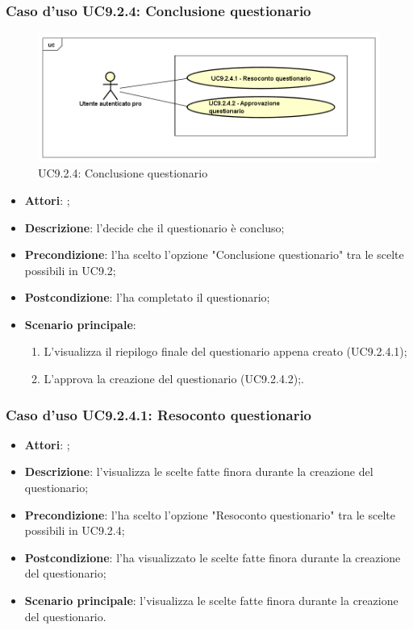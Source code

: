 		\subsubsection{Caso d'uso UC9.2.4: Conclusione questionario}
		\label{UC9.2.4}
		\begin{figure}[h]
			\centering
			\includegraphics[scale=0.5,keepaspectratio]{UML/UC9_2_4.png}
			\caption{UC9.2.4: Conclusione questionario}
		\end{figure}
		\FloatBarrier
		\begin{itemize}
			\item \textbf{Attori}: \uaupro; 
			\item \textbf{Descrizione}: l'\uaupro decide che il questionario è concluso;
			\item \textbf{Precondizione}: l'\uaupro ha scelto l'opzione "Conclusione questionario" tra le scelte possibili in UC9.2;
			\item \textbf{Postcondizione}: l'\uaupro ha completato il questionario;
			\item \textbf{Scenario principale}: 
				\begin{enumerate}
					\item L'\uaupro visualizza il riepilogo finale del questionario appena creato (UC9.2.4.1); 
					\item L'\uaupro approva la creazione del questionario (UC9.2.4.2);.
				\end{enumerate}
		\end{itemize}
				
			\subsubsection{Caso d'uso UC9.2.4.1: Resoconto questionario}
			\label{UC9.2.4.1}
			\begin{itemize}
				\item \textbf{Attori}: \uaupro;
				\item \textbf{Descrizione}: l'\uaupro visualizza le scelte fatte finora durante la creazione del questionario;
				\item \textbf{Precondizione}: l'\uaupro ha scelto l'opzione "Resoconto questionario" tra le scelte possibili in UC9.2.4;
				\item \textbf{Postcondizione}: l'\uaupro ha visualizzato le scelte fatte finora durante la creazione del questionario;
				\item \textbf{Scenario principale}: l'\uaupro visualizza le scelte fatte finora durante la creazione del questionario.
			\end{itemize}
			
